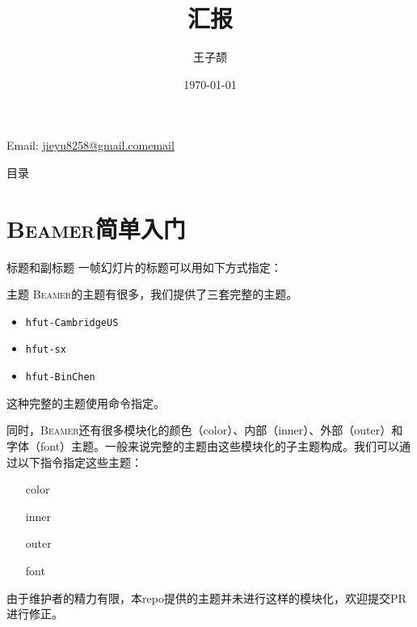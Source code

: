 \documentclass[aspectratio=169]{beamer}
\title{汇报}
\author{王子颉}
\institute{School of Computer and Informatics, HFUT}
\date{\today}
\makeatletter
\newcommand{\Beamer}{\textsc{Beamer}}
\newcommand{\enableindent}{\setlength{\parskip}{6pt}\setlength{\parindent}{2em}}
\newcommand{\contactinfo}{
  \begin{center}
    Email: \href{mailto:jieyu8258@gmail.com}{jieyu8258@gmail.comemail}
  \end{center}
}
\makeatother
\begin{document}
\begin{frame}
	\maketitle
	\contactinfo
\end{frame}

\begin{frame}{目录}
	\tableofcontents
\end{frame}

\section{\Beamer{}简单入门}

\begin{frame}[fragile]{标题}{和副标题}
一帧幻灯片的标题可以用如下方式指定：

\end{frame}

\begin{frame}{主题}
	\enableindent
	\Beamer 的主题有很多，我们提供了三套完整的主题。
	\begin{itemize}
		\item \texttt{hfut-CambridgeUS}
		\item \texttt{hfut-sx}
		\item \texttt{hfut-BinChen}
	\end{itemize}

	这种完整的主题使用\texttt{\usetheme}命令指定。

	\framebreak

	同时，\Beamer 还有很多模块化的颜色（color）、内部（inner）、外部（outer）和字体（font）主题。一般来说完整的主题由这些模块化的子主题构成。我们可以通过以下指令指定这些主题：
	\begin{itemize}
		\item[color] \texttt{\usecolortheme}
		\item[inner] \texttt{\useinnertheme}
		\item[outer] \texttt{\useoutertheme}
		\item[font] \texttt{\usefonttheme}
	\end{itemize}

	由于维护者的精力有限，本repo提供的主题并未进行这样的模块化，欢迎提交PR进行修正。

\end{frame}
\end{document}
